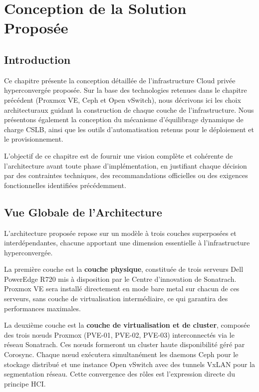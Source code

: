 \chapter{Conception de la Solution Proposée}
\thispagestyle{empty}
\newpage

\section{Introduction}

\par Ce chapitre présente la conception détaillée de l'infrastructure Cloud privée hyperconvergée proposée. Sur la base des technologies retenues dans le chapitre précédent (Proxmox VE, Ceph et Open vSwitch), nous décrivons ici les choix architecturaux guidant la construction de chaque couche de l'infrastructure. Nous présentons également la conception du mécanisme d'équilibrage dynamique de charge CSLB, ainsi que les outils d'automatisation retenus pour le déploiement et le provisionnement.\\

\par L'objectif de ce chapitre est de fournir une vision complète et cohérente de l'architecture avant toute phase d'implémentation, en justifiant chaque décision par des contraintes techniques, des recommandations officielles ou des exigences fonctionnelles identifiées précédemment.\\

\section{Vue Globale de l'Architecture}

\par L'architecture proposée repose sur un modèle à trois couches superposées et interdépendantes, chacune apportant une dimension essentielle à l'infrastructure hyperconvergée.\\

\par La première couche est la \textbf{couche physique}, constituée de trois serveurs Dell PowerEdge R720 mis à disposition par le Centre d'innovation de Sonatrach. Proxmox VE sera installé directement en mode bare metal sur chacun de ces serveurs, sans couche de virtualisation intermédiaire, ce qui garantira des performances maximales.\\

\par La deuxième couche est la \textbf{couche de virtualisation et de cluster}, composée des trois nœuds Proxmox (PVE-01, PVE-02, PVE-03) interconnectés via le réseau Sonatrach. Ces nœuds formeront un cluster haute disponibilité géré par Corosync. Chaque nœud exécutera simultanément les daemons Ceph pour le stockage distribué et une instance Open vSwitch avec des tunnels VxLAN pour la segmentation réseau. Cette convergence des rôles est l'expression directe du principe HCI.\\

